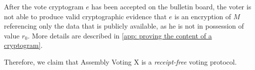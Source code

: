 

After the vote cryptogram $e$ has been accepted on the bulletin board, the voter is not able to produce valid cryptographic evidence that $e$ is an encryption of $M$ referencing only the data that is publicly available, as he is not in possession of value $r_0$. More details are described in \cref{app: proving the content of a cryptogram}.

Therefore, we claim that Assembly Voting X is a \textit{receipt-free} voting protocol.
